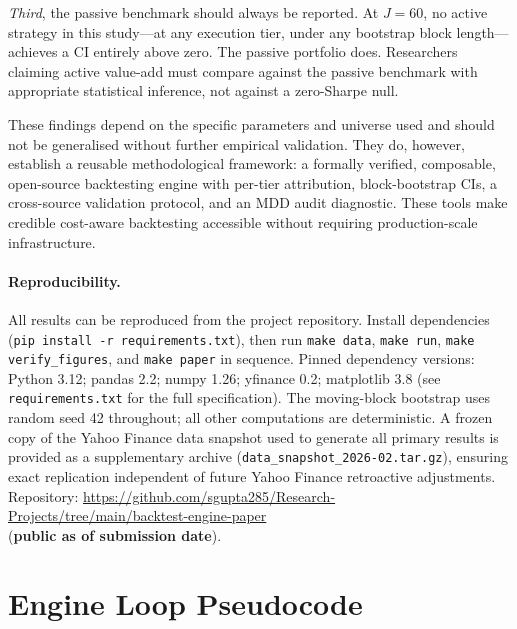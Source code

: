 \documentclass[12pt]{article}
\begin{document}
\textit{Third}, the passive benchmark should always be reported.
At $J=60$, no active strategy in this study---at any execution tier,
under any bootstrap block length---achieves a CI entirely above zero.
The passive portfolio does. Researchers claiming active value-add must compare
against the passive benchmark with appropriate statistical inference,
not against a zero-Sharpe null.

These findings depend on the specific parameters and universe used and
should not be generalised without further empirical validation. They do,
however, establish a reusable methodological framework: a formally
verified, composable, open-source backtesting engine with per-tier
attribution, block-bootstrap CIs, a cross-source validation protocol,
and an MDD audit diagnostic. These tools make credible cost-aware
backtesting accessible without requiring production-scale infrastructure.

\paragraph{Reproducibility.}
All results can be reproduced from the project repository.
Install dependencies (\texttt{pip install -r requirements.txt}),
then run \texttt{make data}, \texttt{make run},
\texttt{make verify\_figures}, and \texttt{make paper} in sequence.
Pinned dependency versions: Python 3.12; pandas 2.2; numpy 1.26;
yfinance 0.2; matplotlib 3.8 (see \texttt{requirements.txt}
for the full specification). The moving-block bootstrap uses random
seed 42 throughout; all other computations are deterministic. A frozen
copy of the Yahoo Finance data snapshot used to generate all primary
results is provided as a supplementary archive
(\texttt{data\_snapshot\_2026-02.tar.gz}), ensuring exact replication
independent of future Yahoo Finance retroactive adjustments.
Repository: \url{https://github.com/sgupta285/Research-Projects/tree/main/backtest-engine-paper}\\
(\textbf{public as of submission date}).

\bigskip



\appendix

\section{Engine Loop Pseudocode}
\label{app:pseudocode}
\end{document}
